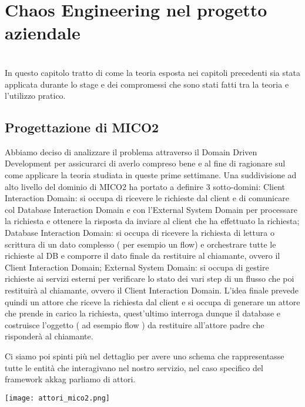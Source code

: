 
\chapter{Chaos Engineering nel progetto aziendale}
\label{cap:analisi-requisiti}

\\
In questo capitolo tratto di come la teoria esposta nei capitoli precedenti sia stata applicata durante lo stage e dei compromessi che sono stati fatti tra la teoria e l'utilizzo pratico.

\section{Progettazione di MICO2}

Abbiamo deciso di analizzare il problema attraverso il Domain Driven Development per assicurarci di averlo compreso bene e al fine di ragionare sul come applicare la teoria studiata in queste prime settimane. 
Una suddivisione ad alto livello del dominio di MICO2 ha portato a definire 3 sotto-domini: Client Interaction Domain: si occupa di ricevere le richieste dal client e di comunicare col Database Interaction Domain e con l’External System Domain per processare la richiesta e ottenere la risposta da inviare al client che ha effettuato la richiesta; 
Database Interaction Domain: si occupa di ricevere la richiesta di lettura o scrittura di un dato complesso ( per esempio un flow) e orchestrare tutte le richieste al DB e comporre il dato finale da restituire al chiamante, ovvero il Client Interaction Domain; 
External System Domain: si occupa di gestire richieste ai servizi esterni per verificare lo stato dei vari step di un flusso che poi restituirà al chiamante, ovvero il Client Interaction Domain. L'idea finale prevede quindi un attore che riceve la richiesta dal client e si occupa di generare un attore che prende in carico la richiesta, quest'ultimo interroga dunque il database e costruisce l'oggetto ( ad esempio flow ) da restituire all'attore padre che risponderà al chiamante.

Ci siamo poi spinti più nel dettaglio per avere uno schema che rappresentasse tutte le entità che interagivano nel nostro servizio, nel caso specifico del framework \gls{akkag} parliamo di attori.
\begin{center}
    \texttt{[image: attori\_mico2.png]}
    \label{tab:schema-attori-mico2}
\end{center}

